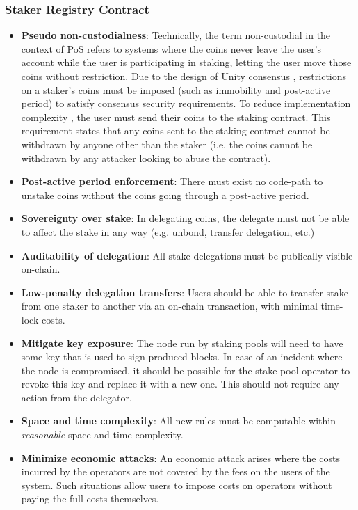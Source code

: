 \subsubsection{Staker Registry Contract}
\begin{itemize}
    \item \textbf{Pseudo non-custodialness}: Technically, the term non-custodial in the context of PoS refers to systems where the coins never leave the user's account while the user is participating in staking, letting the user move those coins without restriction. Due to the design of Unity consensus \cite{WZS19}, restrictions on a staker's coins must be imposed (such as immobility and post-active period) to satisfy consensus security requirements. To reduce implementation complexity \cite{ZZW19}, the user must send their coins to the staking contract. This requirement states that any coins sent to the staking contract cannot be withdrawn by anyone other than the staker (i.e. the coins cannot be withdrawn by any attacker looking to abuse the contract).
    \item \textbf{Post-active period enforcement}: There must exist no code-path to unstake coins without the coins going through a post-active period. 
    \item \textbf{Sovereignty over stake}: In delegating coins, the delegate must not be able to affect the stake in any way (e.g. unbond, transfer delegation, etc.) 
    \item \textbf{Auditability of delegation}: All stake delegations must be publically visible on-chain. 
    \item \textbf{Low-penalty delegation transfers}: Users should be able to transfer stake from one staker to another via an on-chain transaction, with minimal time-lock costs.
    \item \textbf{Mitigate key exposure}: The node run by staking pools will need to have some key that is used to sign produced blocks. In case of an incident where the node is compromised, it should be possible for the stake pool operator to revoke this key and replace it with a new one. This should not require any action from the delegator. 
    \item \textbf{Space and time complexity}: All new rules must be computable within \textit{reasonable} space and time complexity. 
    \item \textbf{Minimize economic attacks}: An economic attack arises where the costs incurred by the operators are not covered by the fees on the users of the system. Such situations allow users to impose costs on operators without paying the full costs themselves.
\end{itemize}

